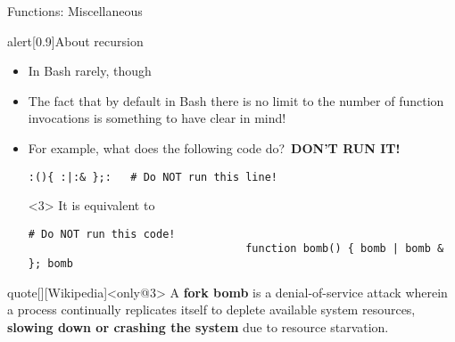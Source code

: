 \begin{frame}[fragile]{Functions: Miscellaneous}
\begin{overlayarea}{\textwidth}{0.7\textheight}
\begin{onlyenv}
\begin{varblock}{alert}[0.9\textwidth]{About recursion}
\begin{itemize}
                    \item In Bash rarely, though
                    \item The fact that by default in Bash there is no limit to the number of function invocations is something to have clear in mind!
                    \item For example, what does the following code do? \,\alert{\textbf{DON'T RUN IT!}}
                          \begin{lstlisting}[style=MyBash, numbers=none, aboveskip=2mm, belowskip=-6mm, xrightmargin=21mm]
                              :(){ :|:& };:   # Do NOT run this line!
                          \end{lstlisting}
                          \begin{uncoverenv}<3>
                              It is equivalent to
                              \begin{lstlisting}[style=MyBash, numbers=none, aboveskip=2mm, belowskip=-5mm, xrightmargin=21mm]
                                  # Do NOT run this code!
                                  function bomb() { bomb | bomb & }; bomb
                              \end{lstlisting}
                          \end{uncoverenv}
                \end{itemize}
            \end{varblock}
            \vspace{-1mm}
            \begin{varblock}{quote}[\textwidth]{}[Wikipedia]<only@3>
                \small A \textbf{fork bomb} is a denial-of-service attack wherein a process continually replicates itself to deplete available system resources,
                \textbf{slowing down or crashing the system} due to resource starvation.\\[-1.5ex] ~
            \end{varblock}
        \end{onlyenv}
    \end{overlayarea}
\end{frame}

